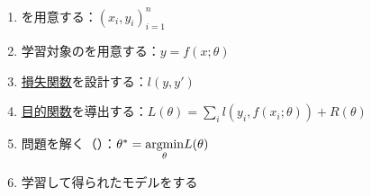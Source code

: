 \documentclass[../../../topic_machine-learning]{subfiles}
\begin{document}
\begin{enumerate}
  \item {}を用意する：$(x_i, y_i)_{i=1}^n$
  \item 学習対象のを用意する：$y = f(x;\theta)$
  \item \hyperref[chap:loss-function]{損失関数}を設計する：$l(y,y')$
  \item \hyperref[chap:objective-function]{目的関数}を導出する：$L(\theta) = \sum_i l(y_i, f(x_i;\theta)) + R(\theta)$
  \item {}問題を解く（）：$\theta^* = \underset{\theta}{\operatorname{argmin}} L(\theta)$
  \item 学習して得られたモデルをする
\end{enumerate}

\end{document}
